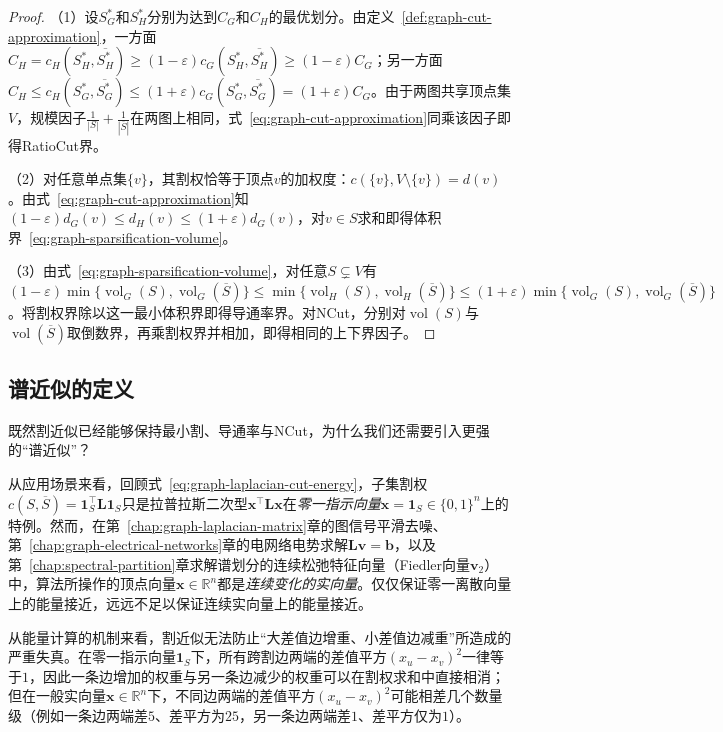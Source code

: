 \begin{proof}
（1）设$S^*_G$和$S^*_H$分别为达到$C_G$和$C_H$的最优划分。由定义~\ref{def:graph-cut-approximation}，一方面$C_H=c_H(S^*_H,\overline{S^*_H})\geq(1-\varepsilon)c_G(S^*_H,\overline{S^*_H})\geq(1-\varepsilon)C_G$；另一方面$C_H\leq c_H(S^*_G,\overline{S^*_G})\leq(1+\varepsilon)c_G(S^*_G,\overline{S^*_G})=(1+\varepsilon)C_G$。由于两图共享顶点集$V$，规模因子$\frac{1}{|S|}+\frac{1}{|\overline S|}$在两图上相同，式~\eqref{eq:graph-cut-approximation}同乘该因子即得RatioCut界。

（2）对任意单点集$\{v\}$，其割权恰等于顶点$v$的加权度：$c(\{v\},V\setminus\{v\})=d(v)$。由式~\eqref{eq:graph-cut-approximation}知$(1-\varepsilon)d_G(v)\leq d_H(v)\leq(1+\varepsilon)d_G(v)$，对$v\in S$求和即得体积界~\eqref{eq:graph-sparsification-volume}。

（3）由式~\eqref{eq:graph-sparsification-volume}，对任意$S\subsetneq V$有$(1-\varepsilon)\min\{\operatorname{vol}_G(S),\operatorname{vol}_G(\overline S)\}\leq\min\{\operatorname{vol}_H(S),\operatorname{vol}_H(\overline S)\}\leq(1+\varepsilon)\min\{\operatorname{vol}_G(S),\operatorname{vol}_G(\overline S)\}$。将割权界除以这一最小体积界即得导通率界。对NCut，分别对$\operatorname{vol}(S)$与$\operatorname{vol}(\overline S)$取倒数界，再乘割权界并相加，即得相同的上下界因子。
\end{proof}

\subsection{谱近似的定义}
\label{sec:graph-spectral-approximation}

既然割近似已经能够保持最小割、导通率与NCut，为什么我们还需要引入更强的“谱近似”？

从应用场景来看，回顾式~\eqref{eq:graph-laplacian-cut-energy}，子集割权$c(S,\overline S)=\bm 1_S^\top\bm L\bm 1_S$只是拉普拉斯二次型$\bm x^\top\bm L\bm x$在\emph{零一指示向量}$\bm x=\bm 1_S\in\{0,1\}^n$上的特例。然而，在第~\ref{chap:graph-laplacian-matrix}章的图信号平滑去噪、第~\ref{chap:graph-electrical-networks}章的电网络电势求解$\bm L\bm v=\bm b$，以及第~\ref{chap:spectral-partition}章求解谱划分的连续松弛特征向量（Fiedler向量$\bm v_2$）中，算法所操作的顶点向量$\bm x\in\mathbb R^n$都是\emph{连续变化的实向量}。仅仅保证零一离散向量上的能量接近，远远不足以保证连续实向量上的能量接近。

从能量计算的机制来看，割近似无法防止“大差值边增重、小差值边减重”所造成的严重失真。在零一指示向量$\bm 1_S$下，所有跨割边两端的差值平方$(x_u-x_v)^2$一律等于$1$，因此一条边增加的权重与另一条边减少的权重可以在割权求和中直接相消；但在一般实向量$\bm x\in\mathbb R^n$下，不同边两端的差值平方$(x_u-x_v)^2$可能相差几个数量级（例如一条边两端差$5$、差平方为$25$，另一条边两端差$1$、差平方仅为$1$）。

